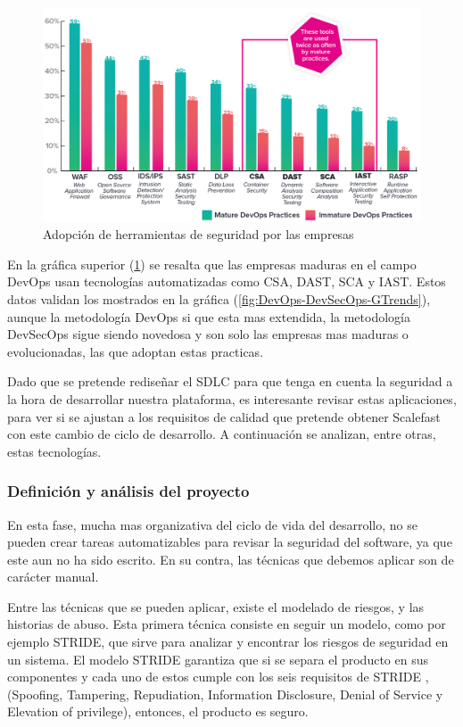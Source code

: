 \documentclass[12pt]{report} %
\begin{document}
\begin{figure}[H] 
  \includegraphics[width=\textwidth]{sonatype-tools}
  \caption{Adopción de herramientas de seguridad por las empresas}
  \label{fig:sonatype-tools}
\end{figure}

En la gráfica superior (\ref{fig:sonatype-tools}) se resalta que las empresas
maduras en el campo DevOps usan tecnologías automatizadas como \gls{CSA},
\gls{DAST}, \gls{SCA} y \gls{IAST}.  
Estos datos validan los mostrados en la gráfica
(\ref{fig:DevOps-DevSecOps-GTrends}), aunque la metodología \gls{DevOps} si que
esta mas extendida, la metodología \gls{DevSecOps} sigue siendo novedosa y son
solo las empresas mas maduras o evolucionadas, las que adoptan estas practicas.

Dado que se pretende rediseñar el \gls{SDLC} para que tenga en
cuenta la seguridad a la hora de desarrollar nuestra plataforma, es interesante
revisar estas aplicaciones, para ver si se ajustan a los requisitos de calidad
que pretende obtener Scalefast con este cambio de ciclo de desarrollo.
A continuación se analizan, entre otras, estas tecnologías.

\subsubsection{Definición y análisis del proyecto} \label{definicionyanalisis}

En esta fase, mucha mas organizativa del ciclo de vida del desarrollo, no se
pueden crear tareas automatizables para revisar la seguridad del software, ya
que este aun no ha sido escrito.  En su contra, las técnicas que debemos aplicar
son de carácter manual.

Entre las técnicas que se pueden aplicar, existe el modelado de riesgos, y las
historias de abuso.  Esta primera técnica consiste en seguir un modelo, como por
ejemplo \gls{STRIDE}, que sirve para analizar y encontrar los riesgos de
seguridad en un sistema.  El modelo \gls{STRIDE} garantiza que si se separa el
producto en sus componentes y cada uno de estos cumple con los seis requisitos
de \gls{STRIDE} \cite{Loren1999}, (Spoofing, Tampering, Repudiation, Information
Disclosure, Denial of Service y Elevation of privilege), entonces, el producto
es seguro.
\end{document}
